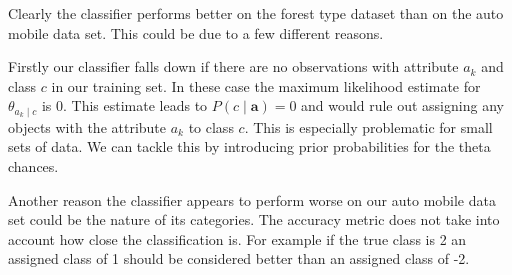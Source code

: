 Clearly the classifier performs better on the forest type dataset than on the auto mobile data set.
This could be due to a few different reasons.

Firstly our classifier falls down if there are no observations with attribute $a_k$ and class $c$ in our training set. In these case the maximum likelihood estimate for $\theta_{a_k \mid c}$ is 0.
This estimate leads to $P(c \mid \mathbf{a}) = 0$ and would rule out assigning any objects with the attribute $a_k$ to class $c$.
This is especially problematic for small sets of data.
We can tackle this by introducing prior probabilities for the theta chances.

Another reason the classifier appears to perform worse on our auto mobile data set could be the nature of its categories.
The accuracy metric does not take into account how close the classification is.
For example if the true class is 2 an assigned class of 1 should be considered better than an assigned class of -2.

